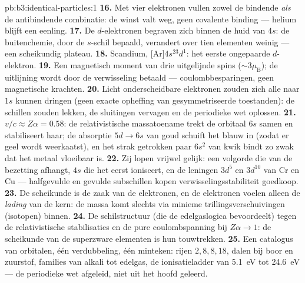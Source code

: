 \begin{solution}{pb:b3:identical-particles:1}
\textbf{16.} Met vier elektronen vullen zowel de bindende \emph{als} de
antibindende combinatie: de winst valt weg, geen covalente binding ---
helium blijft een eenling.
\textbf{17.} De $d$-elektronen begraven zich binnen de huid van $4s$: de
buitenchemie, door de $s$-schil bepaald, verandert over tien elementen
weinig --- een scheikundig plateau.
\textbf{18.} Scandium, [Ar]$4s^23d^1$: het eerste ongepaarde
$d$-elektron.
\textbf{19.} Een magnetisch moment van drie uitgelijnde spins
($\sim3\mu_{\text{B}}$); de uitlijning wordt door de verwisseling betaald
--- coulombbesparingen, geen magnetische krachten.
\textbf{20.} Licht onderscheidbare elektronen zouden zich alle naar $1s$
kunnen dringen (geen exacte opheffing van gesymmetriseerde toestanden): de
schillen zouden lekken, de sluitingen vervagen en de periodieke wet
oplossen.
\textbf{21.} $v/c \approx Z\alpha = 0.58$: de relativistische
massatoename trekt de orbitaal $6s$ samen en stabiliseert haar; de
absorptie $5d \to 6s$ van goud schuift het blauw in (zodat er geel wordt
weerkaatst), en het strak getrokken paar $6s^2$ van kwik bindt zo zwak dat
het metaal vloeibaar is.
\textbf{22.} Zij lopen vrijwel gelijk: een volgorde die van de bezetting
afhangt, $4s$ die het eerst ioniseert, en de leningen $3d^5$ en $3d^{10}$
van Cr en Cu --- halfgevulde en gevulde subschillen kopen
verwisselingsstabiliteit goedkoop.
\textbf{23.} De scheikunde is de zaak van de elektronen, en de elektronen
voelen alleen de \emph{lading} van de kern: de massa komt slechts via
minieme trillingsverschuivingen (isotopen) binnen.
\textbf{24.} De schilstructuur (die de edelgaslogica bevoordeelt) tegen de
relativistische stabilisaties en de pure coulombspanning bij $Z\alpha \to 1$: de scheikunde van de superzware elementen is hun touwtrekken.
\textbf{25.} Een catalogus van orbitalen, één verdubbeling, één minteken:
rijen $2, 8, 8, 18$, dalen bij boor en zuurstof, families van alkali tot
edelgas, de ionisatieladder van \qty{5.1}{eV} tot \qty{24.6}{eV} --- de
periodieke wet afgeleid, niet uit het hoofd geleerd.
\end{solution}
